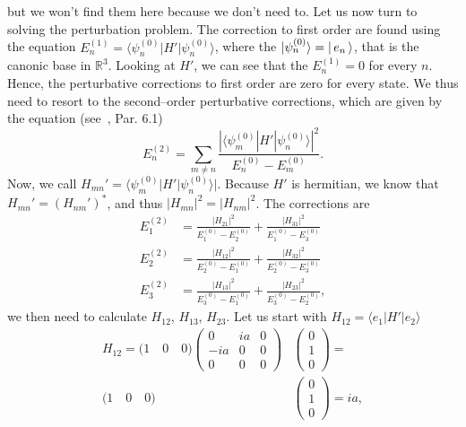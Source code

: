 but we won't find them here because we don't need to.
Let us now turn to solving the perturbation problem. The correction to first order are found using the equation $E_n^{(1)} = \langle \psi_n^{(0)} | H' | \psi_n^{(0)} \rangle$, where the $|\psi_n^{(0)} \rangle = | \, e_n \, \rangle$, that is the canonic base in $\mathbb{R}^3$. Looking at $H'$, we can see that the $E_n^{(1)} = 0$ for every $n$. Hence, the perturbative corrections to first order are zero for every state. We thus need to resort to the second--order perturbative corrections, which are given by the equation (see~\cite{griffiths2018introduction}, Par. 6.1)
\begin{equation}
    \label{eq: E2_pert_nondeg}
    E_n^{(2)} = \sum_{m \ne n} \frac{| \langle \psi_m^{(0)} | H' | \psi_n^{(0)} \rangle |^2 } {E_n^{(0)} - E_m^{(0)}}.
\end{equation}
Now, we call $H_{mn}' = \langle \psi_m^{(0)} | H' | \psi_n^{(0)} \rangle |$. Because $H'$ is hermitian, we know that $H_{mn}' = (H_{nm}')^*$, and thus $ \left| H_{mn} \right|^2 = \left| H_{nm} \right|^2 $. The corrections are
\begin{align}
    \label{eq: En_2order}
    E_1^{(2)} & = \frac{\left| H_{21} \right|^2}{E_1^{(0)} - E_2^{(0)}} + \frac{\left| H_{31} \right|^2}{E_1^{(0)} - E_3^{(0)}} \\
    E_2^{(2)} & = \frac{\left| H_{12} \right|^2}{E_2^{(0)} - E_1^{(0)}} + \frac{\left| H_{32} \right|^2}{E_2^{(0)} - E_3^{(0)}} \\
    E_3^{(2)} & = \frac{\left| H_{13} \right|^2}{E_3^{(0)} - E_1^{(0)}} + \frac{\left| H_{23} \right|^2}{E_3^{(0)} - E_2^{(0)}},  
\end{align}
we then need to calculate $ H_{12} $, $ H_{13} $, $ H_{23} $. Let us start with $H_{12} = \langle e_1 | H' | e_2 \rangle$
\begin{equation}
    \label{eq: H12}
    \begin{split}
        H_{12} = \bigl( 1 \quad 0 \quad 0 \bigr)
        \begin{pmatrix}
            0 & ia & 0 \\
            -ia & 0 & 0 \\
            0 & 0 & 0
        \end{pmatrix} &
        \begin{pmatrix}
            0 \\ 
            1 \\
            0
        \end{pmatrix} = \\
        \bigl( 1 \quad 0 \quad 0 \bigr) &
        \begin{pmatrix}
            0 \\ 
            1 \\
            0
        \end{pmatrix} = ia,
    \end{split}
\end{equation}
